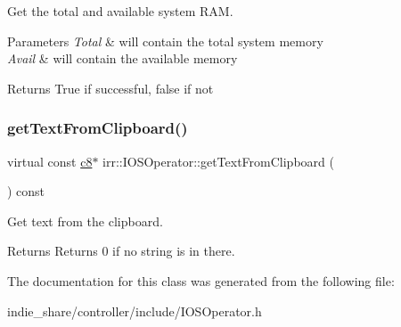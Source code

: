 Get the total and available system R\+AM. 


\begin{DoxyParams}{Parameters}
{\em Total} & will contain the total system memory \\
\hline
{\em Avail} & will contain the available memory \\
\hline
\end{DoxyParams}
\begin{DoxyReturn}{Returns}
True if successful, false if not 
\end{DoxyReturn}
\mbox{\label{classirr_1_1IOSOperator_a9026ff9f28b48615971e18fcee6fff4c}} 
\subsubsection{\texorpdfstring{get\+Text\+From\+Clipboard()}{getTextFromClipboard()}}
{\footnotesize\ttfamily virtual const \hyperlink{namespaceirr_a9395eaea339bcb546b319e9c96bf7410}{c8}$\ast$ irr\+::\+I\+O\+S\+Operator\+::get\+Text\+From\+Clipboard (\begin{DoxyParamCaption}{ }\end{DoxyParamCaption}) const\hspace{0.3cm}{\ttfamily [pure virtual]}}



Get text from the clipboard. 

\begin{DoxyReturn}{Returns}
Returns 0 if no string is in there. 
\end{DoxyReturn}


The documentation for this class was generated from the following file\+:\begin{DoxyCompactItemize}
\item 
indie\+\_\+share/controller/include/I\+O\+S\+Operator.\+h\end{DoxyCompactItemize}
